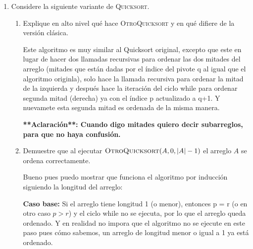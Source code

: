 \documentclass{article}
\begin{document}
\begin{enumerate}
    \item Considere la siguiente variante de \textsc{Quicksort}.

        \begin{minipage}[H]{0.943\textwidth}
        \begin{algorithm}[H]
            \DontPrintSemicolon
            \caption{\textsc{OtroQuicksort}}
        \end{algorithm}
        \end{minipage}

        \begin{enumerate}
            \item Explique en alto nivel qu\'e hace \textsc{OtroQuicksort} y
                en qu\'e difiere de la versi\'on cl\'asica.

            Este algoritmo es muy similar al Quicksort original, excepto que este en lugar de hacer dos llamadas recursivas
            para ordenar las dos mitades del arreglo (mitades que están dadas por el índice del pivote q al igual que el algoritmo originla), solo hace la
            llamada recursiva para ordenar la mitad de la izquierda y después hace la iteración del ciclo while para ordenar
            segunda mitad (derecha) ya con el índice p actualizado a q+1. Y nuevamete esta segunda mitad es ordenada de la misma manera.
            
            \medskip
            \textbf{**Aclaración**: Cuando digo mitades quiero decir subarreglos, para que no haya confusión.}
            \medskip

            \item Demuestre que al ejecutar $\textsc{OtroQuicksort}(A, 0,
                |A|-1)$ el arreglo $A$ se ordena correctamente.

            Bueno pues puedo mostrar que funciona el algoritmo por inducción siguiendo la longitud del arreglo:

            \textbf{Caso base:} Si el arreglo tiene longitud 1 (o menor), entonces p = r (o en otro caso $p > r$) y el ciclo while no se ejecuta, por lo que el arreglo queda ordenado.
            Y en realidad no impora que el algoritmo no se ejecute en este paso pues cómo sabemos, un arreglo de longitud menor o igual a 1 ya está ordenado.
            

\end{enumerate}
\end{enumerate}
\end{document}
